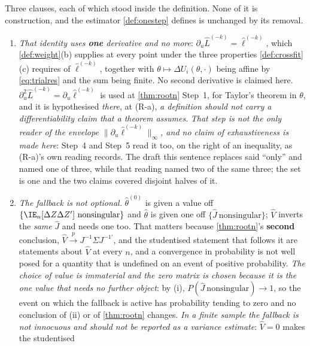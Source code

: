 \begin{remark}\label{rem:onestepread}
Three clauses, each of which stood inside the definition. None of it is construction, and the
estimator \cref{def:onestep} defines is unchanged by its removal.
\begin{enumerate}
\item[(1)] \emph{That identity uses \textbf{one} derivative and no more}:
$\partial_u\hat L^{(-k)}=\hat\ell^{(-k)}$, which \cref{def:weight}(b) supplies at every point under the three
properties \cref{def:crossfit}(c) requires of $\hat\ell^{(-k)}$, together with $\theta\mapsto\Delta U_i(\theta,\cdot)$
being affine by \eqref{eq:trialres} and the sum being finite. No second derivative is claimed here.
$\partial_u^{2}\hat L^{(-k)}=\partial_u\hat\ell^{(-k)}$ is used at \cref{thm:rootn} Step~1, for Taylor's
theorem in $\theta$, and it is hypothesised \emph{there}, at (R-a), \emph{a definition should not carry a
differentiability claim that a theorem assumes}. \emph{That step is not the only reader of the
envelope $\|\partial_u\hat\ell^{(-k)}\|_\infty$, and no claim of exhaustiveness is made here}:
 Step~4 and  Step~5 read it too, on the right of an
inequality, as (R-a)'s own reading records. The draft this sentence replaces said ``only'' and named
one of three, while that reading named two of the same three; the set is one and the two claims
covered disjoint halves of it.
\item[(2)] \emph{The fallback is not optional.} $\hat\theta^{(0)}$ is given a value off $\{\IE_n[\Delta Z\Delta Z']\
\text{nonsingular}\}$ and $\hat\theta$ is given one off $\{\hat J\ \text{nonsingular}\}$;
$\hat V$ inverts the \emph{same} $\hat J$ and needs one too. That matters because
\cref{thm:rootn}'s \textbf{second} conclusion, $\hat V\xrightarrow{p}J^{-1}\Sigma J^{-1\prime}$, and the
studentised statement that follows it are statements about $\hat V$ at every $n$, and a convergence in
probability is not well posed for a quantity that is undefined on an event of positive probability.
\emph{The choice of value is immaterial and the zero matrix is chosen because it is the one value that
needs no further object}: by \suppref{Lemma}{sandwich}\textup{(i)}, $P(\hat J\ \text{nonsingular})\to1$, so the
event on which the fallback is active has probability tending to zero and no conclusion of
\suppref{Lemma}{sandwich}\textup{(ii)} or of \cref{thm:rootn} changes. \emph{In a finite sample the fallback is
not innocuous and should not be reported as a variance estimate}: $\hat V=0$ makes the studentised

\end{enumerate}
\end{remark}
